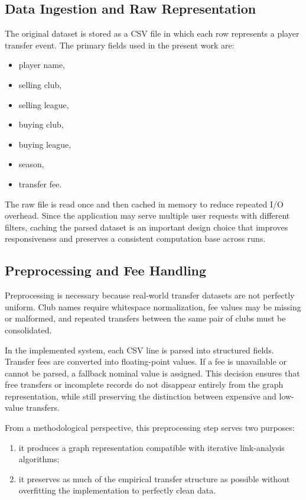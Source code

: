 \subsection{Data Ingestion and Raw Representation}
\label{subsec:data_ingestion}

The original dataset is stored as a CSV file in which each row represents a player transfer event. The primary fields used in the present work are:
\begin{itemize}
    \item player name,
    \item selling club,
    \item selling league,
    \item buying club,
    \item buying league,
    \item season,
    \item transfer fee.
\end{itemize}

The raw file is read once and then cached in memory to reduce repeated I/O overhead. Since the application may serve multiple user requests with different filters, caching the parsed dataset is an important design choice that improves responsiveness and preserves a consistent computation base across runs.


\subsection{Preprocessing and Fee Handling}
\label{subsec:preprocessing}

Preprocessing is necessary because real-world transfer datasets are not perfectly uniform. Club names require whitespace normalization, fee values may be missing or malformed, and repeated transfers between the same pair of clubs must be consolidated.

In the implemented system, each CSV line is parsed into structured fields. Transfer fees are converted into floating-point values. If a fee is unavailable or cannot be parsed, a fallback nominal value is assigned. This decision ensures that free transfers or incomplete records do not disappear entirely from the graph representation, while still preserving the distinction between expensive and low-value transfers.

From a methodological perspective, this preprocessing step serves two purposes:
\begin{enumerate}
    \item it produces a graph representation compatible with iterative link-analysis algorithms;
    \item it preserves as much of the empirical transfer structure as possible without overfitting the implementation to perfectly clean data.
\end{enumerate}


